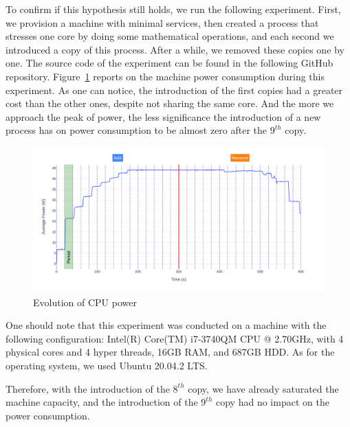 To confirm if this hypothesis still holds, we run the following experiment.
First, we provision a machine with minimal services, then created a process that stresses one core by doing some mathematical operations, and each second we introduced a copy of this process.
After a while, we removed these copies one by one.
The source code of the experiment can be found in the following GitHub repository.
Figure~\ref{fig:power_evolution_greenfaas} reports on the machine power consumption during this experiment.
As one can notice, the introduction of the first copies had a greater cost than the other ones, despite not sharing the same core.
And the more we approach the peak of power, the less significance the introduction of a new process has on power consumption to be almost zero after the $9^{th}$ copy.

\begin{figure}[!h]
      \centering
      \includegraphics[width=\linewidth]{chapters/power_evolution_greenfaas}
      \caption{Evolution of CPU power}
      \label{fig:power_evolution_greenfaas}
\end{figure}

One should note that this experiment was conducted on a machine with the following configuration: Intel(R) Core(TM) i7-3740QM CPU @ 2.70GHz, with 4 physical cores and 4 hyper threads, 16GB RAM, and 687GB HDD.
As for the operating system, we used Ubuntu 20.04.2 LTS. 

Therefore, with the introduction of the $8^{th}$ copy, we have already saturated the machine capacity, and the introduction of the $9^{th}$ copy had no impact on the power consumption.

